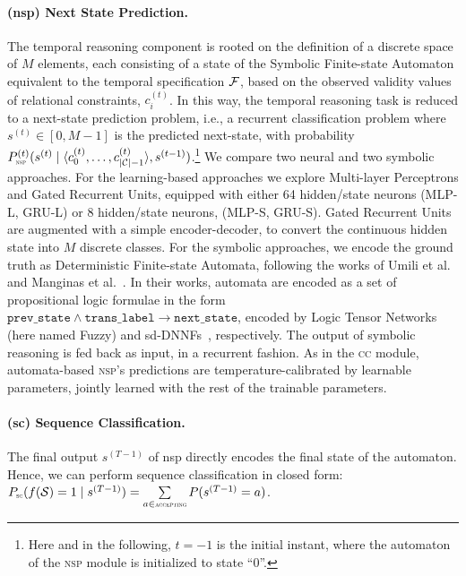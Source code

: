 \paragraph{{\sc (nsp)} Next State Prediction.} The temporal reasoning component is rooted on the definition of a discrete space of $M$ elements, each consisting of a state of the Symbolic Finite-state Automaton equivalent to the temporal specification ${\mathcal{F}}$, based on the observed validity values of relational constraints, $c_i^{(t)}$. 
In this way, the temporal reasoning task is reduced to a next-state prediction problem, i.e., a recurrent classification problem where $s^{(t)} \in [0, M-1]$ is the predicted next-state, with probability $P^{(t)}_{\text{\sc\tiny nsp}}(s^{(t)} \mid \langle c_{0}^{(t)}, \ldots, c_{|{\mathcal{C}}|-1}^{(t)}\rangle, s^{(t-1)})$.\footnote{Here and in the following, $t = -1$ is the initial instant, where the automaton of the \textsc{nsp} module is initialized to state ``$0$''.} 
We compare two neural and two symbolic approaches.
For the learning-based approaches we explore Multi-layer Perceptrons and Gated Recurrent Units, equipped with either 64 hidden/state neurons (MLP-L, GRU-L) or 8 hidden/state neurons, (MLP-S, GRU-S).
Gated Recurrent Units are augmented with a simple encoder-decoder, to convert the continuous hidden state into $M$ discrete classes.
For the symbolic approaches, we encode the ground truth as Deterministic Finite-state Automata, following the works of Umili et al.~\cite{umili2023grounding} and Manginas et al.~\cite{manginas2024nesya}. 
In their works, automata are encoded as a set of propositional logic formulae in the form $\texttt{prev\_state} \wedge \texttt{trans\_label} \rightarrow \texttt{next\_state}$, encoded by Logic Tensor Networks~\cite{badreddine2022logic} (here named Fuzzy) and sd-DNNFs~\cite{darwiche2002knowledge}, respectively. The output of symbolic reasoning is fed back as input, in a recurrent fashion.
As in the \textsc{cc} module, automata-based \textsc{nsp}'s predictions are temperature-calibrated by learnable parameters, jointly learned with the rest of the trainable parameters.

\paragraph{{\sc (sc)} Sequence Classification.} The final output $s^{(T-1)}$ of {\sc nsp} directly encodes the final state of the automaton. Hence, we can perform sequence classification in closed form: $P_{\text{\sc\tiny sc}}(f({\mathcal{S}}) = 1 \mid s^{(T-1)}) = \sum\limits_{a \in \text{\sc\tiny accepting}} P(s^{(T-1)} = a)$. 

